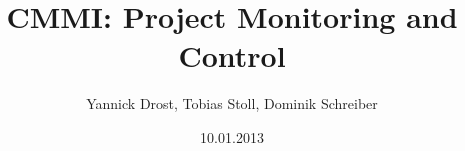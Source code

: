 \documentclass[accentcolor=tud10d]{tudbeamer}
\title{CMMI: Project Monitoring and Control}
\author{Yannick Drost, Tobias Stoll, Dominik Schreiber}
\date{10.01.2013}
\begin{document}
\begin{titleframe}
\end{titleframe}
\end{document}

